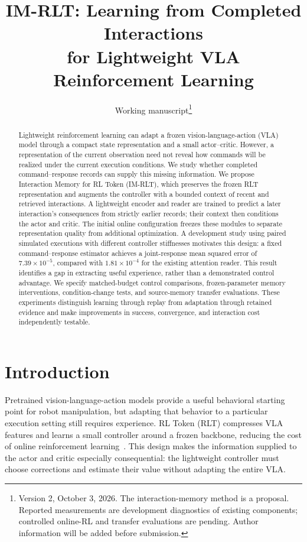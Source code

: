 \documentclass[10pt,letterpaper]{article}
\title{\textbf{IM-RLT: Learning from Completed Interactions\protect\\ for Lightweight VLA Reinforcement Learning}}
\author{Working manuscript\thanks{Version 2, October 3, 2026. The interaction-memory method is a proposal. Reported measurements are development diagnostics of existing components; controlled online-RL and transfer evaluations are pending. Author information will be added before submission.}}
\date{}
\begin{document}
\maketitle
\begin{abstract}
Lightweight reinforcement learning can adapt a frozen vision-language-action (VLA) model through a compact state representation and a small actor--critic. However, a representation of the current observation need not reveal how commands will be realized under the current execution conditions. We study whether completed command--response records can supply this missing information. We propose Interaction Memory for RL Token (IM-RLT), which preserves the frozen RLT representation and augments the controller with a bounded context of recent and retrieved interactions. A lightweight encoder and reader are trained to predict a later interaction's consequences from strictly earlier records; their context then conditions the actor and critic. The initial online configuration freezes these modules to separate representation quality from additional optimization. A development study using paired simulated executions with different controller stiffnesses motivates this design: a fixed command--response estimator achieves a joint-response mean squared error of $7.39\times10^{-5}$, compared with $1.81\times10^{-4}$ for the existing attention reader. This result identifies a gap in extracting useful experience, rather than a demonstrated control advantage. We specify matched-budget control comparisons, frozen-parameter memory interventions, condition-change tests, and source-memory transfer evaluations. These experiments distinguish learning through replay from adaptation through retained evidence and make improvements in success, convergence, and interaction cost independently testable.
\end{abstract}

\section{Introduction}
Pretrained vision-language-action models provide a useful behavioral starting point for robot manipulation, but adapting that behavior to a particular execution setting still requires experience. RL Token (RLT) compresses VLA features and learns a small controller around a frozen backbone, reducing the cost of online reinforcement learning~\citep{rlt}. This design makes the information supplied to the actor and critic especially consequential: the lightweight controller must choose corrections and estimate their value without adapting the entire VLA.
\end{document}

